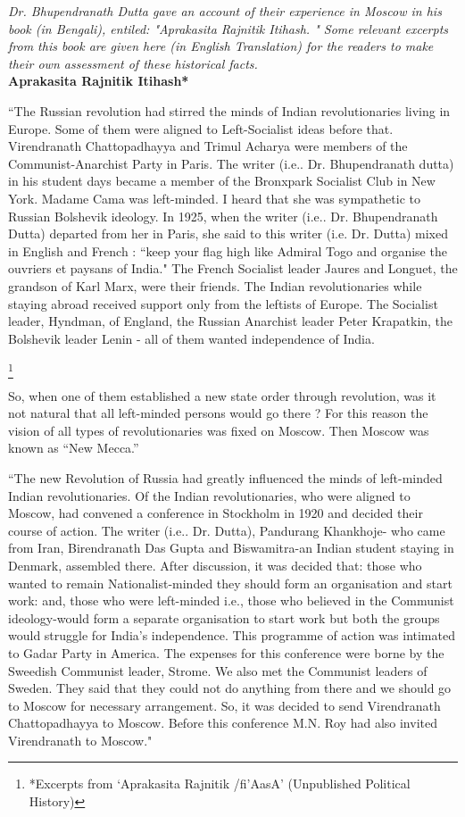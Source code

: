 \textit{Dr. Bhupendranath Dutta gave an account of their experience in Moscow in his book (in Bengali), entiled: "Aprakasita Rajnitik Itihash. " Some relevant excerpts from this book are given here (in English Translation) for the readers to make their own assessment of these historical 
facts. }\\

\textbf{Aprakasita Rajnitik Itihash*}

“The Russian revolution had stirred the minds of Indian revolutionaries living in Europe. Some of them were aligned to Left-Socialist ideas before that. Virendranath Chattopadhayya and Trimul Acharya were members of the Communist-Anarchist Party in Paris. The writer (i.e.. Dr. 
Bhupendranath dutta) in his student days became a member of the Bronxpark Socialist Club in New York. Madame Cama was left-minded. I heard that she was sympathetic to Russian Bolshevik ideology. In 1925, when the writer (i.e.. Dr. Bhupendranath Dutta) departed from her in Paris, 
she said to this writer (i.e. Dr. Dutta) mixed in English and French : “keep your flag high like Admiral Togo and organise the ouvriers et paysans of India." The French Socialist leader Jaures and Longuet, the grandson of Karl Marx, were their friends. The Indian revolutionaries while staying abroad received support only from the leftists of Europe. The Socialist leader, Hyndman, of England, the Russian Anarchist leader Peter Krapatkin, the Bolshevik leader Lenin - all of them wanted independence of India. 

\footnote{*Excerpts from ‘Aprakasita Rajnitik /fi'AasA' (Unpublished Political History) }


So, when one of them established a new state order through revolution, was it not natural that all left-minded persons would go there ? For this reason the vision of all types of revolutionaries was fixed on Moscow. Then Moscow was known as “New Mecca.” 

“The new Revolution of Russia had greatly influenced the minds of left-minded Indian revolutionaries. Of the Indian revolutionaries, who were aligned to Moscow, had convened a conference in Stockholm in 1920 and decided their course of action. The writer (i.e.. Dr. Dutta), Pandurang Khankhoje- who came from Iran, Birendranath Das Gupta and Biswamitra-an Indian student staying in Denmark, assembled there. After discussion, it was decided that: those who wanted to remain Nationalist-minded they should form an organisation and start work: and, those who were left-minded i.e., those who believed in the Communist ideology-would form a separate organisation to start work but both the groups would struggle for India’s independence. This programme of action was intimated to Gadar Party in America. The expenses for this conference were 
borne by the Sweedish Communist leader, Strome. We also met the Communist leaders of Sweden. They said that they could not do anything from there and we should go to Moscow for necessary arrangement. So, it was decided to send Virendranath Chattopadhayya to Moscow. Before this conference M.N. Roy had also invited Virendranath to Moscow." 

